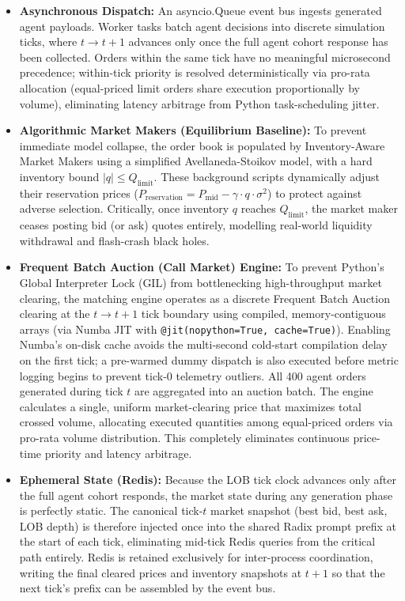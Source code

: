 \documentclass[10pt,a4paper]{article}
\begin{document}
\begin{itemize}
    \item \textbf{Asynchronous Dispatch:} An asyncio.Queue event bus ingests generated agent payloads. Worker tasks batch agent decisions into discrete simulation ticks, where $t \to t+1$ advances only once the full agent cohort response has been collected. Orders within the same tick have no meaningful microsecond precedence; within-tick priority is resolved deterministically via pro-rata allocation (equal-priced limit orders share execution proportionally by volume), eliminating latency arbitrage from Python task-scheduling jitter.
    \item \textbf{Algorithmic Market Makers (Equilibrium Baseline):} To prevent immediate model collapse, the order book is populated by Inventory-Aware Market Makers using a simplified Avellaneda-Stoikov model, with a hard inventory bound $|q| \le Q_{\text{limit}}$. These background scripts dynamically adjust their reservation prices ($P_{\text{reservation}} = P_{\text{mid}} - \gamma \cdot q \cdot \sigma^2$) to protect against adverse selection. Critically, once inventory $q$ reaches $Q_{\text{limit}}$, the market maker ceases posting bid (or ask) quotes entirely, modelling real-world liquidity withdrawal and flash-crash black holes.
    \item \textbf{Frequent Batch Auction (Call Market) Engine:} To prevent Python's Global Interpreter Lock (GIL) from bottlenecking high-throughput market clearing, the matching engine operates as a discrete Frequent Batch Auction clearing at the $t \to t+1$ tick boundary using compiled, memory-contiguous arrays (via Numba JIT with \texttt{@jit(nopython=True, cache=True)}). Enabling Numba's on-disk cache avoids the multi-second cold-start compilation delay on the first tick; a pre-warmed dummy dispatch is also executed before metric logging begins to prevent tick-0 telemetry outliers. All 400 agent orders generated during tick $t$ are aggregated into an auction batch. The engine calculates a single, uniform market-clearing price that maximizes total crossed volume, allocating executed quantities among equal-priced orders via pro-rata volume distribution. This completely eliminates continuous price-time priority and latency arbitrage.
    
    \item \textbf{Ephemeral State (Redis):} Because the LOB tick clock advances only after the full agent cohort responds, the market state during any generation phase is perfectly static. The canonical tick-$t$ market snapshot (best bid, best ask, LOB depth) is therefore injected once into the shared Radix prompt prefix at the start of each tick, eliminating mid-tick Redis queries from the critical path entirely. Redis is retained exclusively for inter-process coordination, writing the final cleared prices and inventory snapshots at $t+1$ so that the next tick's prefix can be assembled by the event bus.
    

\end{itemize}
\end{document}
